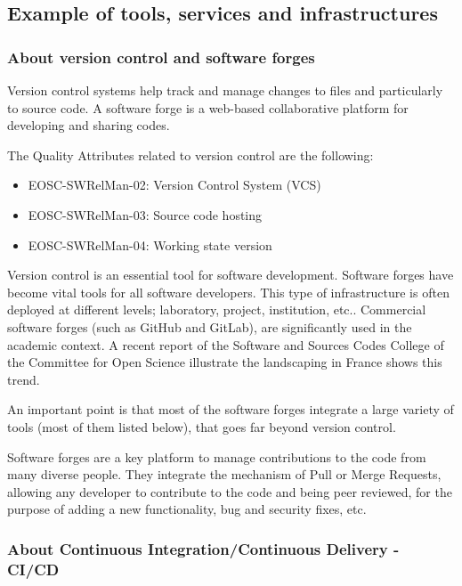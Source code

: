 \subsection{Example of tools, services and infrastructures}

\subsubsection{About version control and software forges}

Version control systems help track and manage changes to files and particularly to source code. A software forge is a web-based collaborative platform for developing and sharing codes.

The Quality Attributes related to version control are the following:

\begin{itemize}
  \item EOSC-SWRelMan-02: Version Control System (VCS)
  \item EOSC-SWRelMan-03: Source code hosting
  \item EOSC-SWRelMan-04: Working state version
\end{itemize}

Version control is an essential tool for software development. Software forges have become vital tools for all software developers. This type of infrastructure is often deployed at different levels; laboratory, project, institution, etc.. Commercial software forges (such as GitHub and GitLab), are significantly used in the academic context. A recent report of the Software and Sources Codes College of the Committee for Open Science illustrate the landscaping in France \cite{leberre:hal-04208924} shows this trend.

An important point is that most of the software forges integrate a large variety of tools (most of them listed below), that goes far beyond version control.

Software forges are a key platform to manage contributions to the code from many diverse people. They integrate the mechanism of Pull or Merge Requests, allowing any developer to contribute to the code and being peer reviewed, for the purpose of adding a new functionality, bug and security fixes, etc.

\subsubsection{About Continuous Integration/Continuous Delivery - CI/CD}
\label{sec_cicd}

